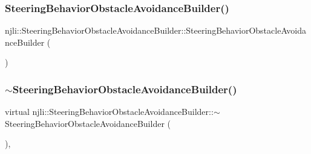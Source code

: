 \subsubsection{\texorpdfstring{Steering\+Behavior\+Obstacle\+Avoidance\+Builder()}{SteeringBehaviorObstacleAvoidanceBuilder()}\hspace{0.1cm}{\footnotesize\ttfamily [2/2]}}
{\footnotesize\ttfamily njli\+::\+Steering\+Behavior\+Obstacle\+Avoidance\+Builder\+::\+Steering\+Behavior\+Obstacle\+Avoidance\+Builder (\begin{DoxyParamCaption}\item[{const \mbox{\hyperlink{classnjli_1_1_steering_behavior_obstacle_avoidance_builder}{Steering\+Behavior\+Obstacle\+Avoidance\+Builder}} \&}]{ }\end{DoxyParamCaption})\hspace{0.3cm}{\ttfamily [protected]}}

\mbox{\label{classnjli_1_1_steering_behavior_obstacle_avoidance_builder_af11f994bd10c90902989e82ba0e0d916}} 
\subsubsection{\texorpdfstring{$\sim$\+Steering\+Behavior\+Obstacle\+Avoidance\+Builder()}{~SteeringBehaviorObstacleAvoidanceBuilder()}}
{\footnotesize\ttfamily virtual njli\+::\+Steering\+Behavior\+Obstacle\+Avoidance\+Builder\+::$\sim$\+Steering\+Behavior\+Obstacle\+Avoidance\+Builder (\begin{DoxyParamCaption}{ }\end{DoxyParamCaption})\hspace{0.3cm}{\ttfamily [protected]}, {\ttfamily [virtual]}}



